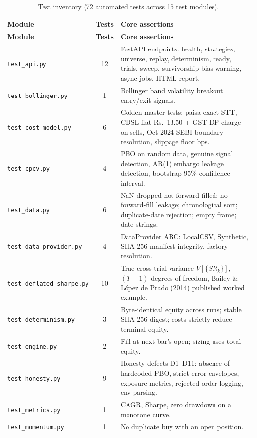 \documentclass[12pt,a4paper,oneside]{report}
\newcommand{\rupee}{Rs.\ }
\begin{document}
\begin{center}
\small
\begin{longtable}{@{}p{4.5cm}cp{7.0cm}@{}}
\caption[Automated Test Inventory]{Test inventory (72 automated tests across 16 test modules).} \label{tab:tests} \\
\toprule
\textbf{Module} & \textbf{Tests} & \textbf{Core assertions} \\
\midrule
\endfirsthead
\toprule
\textbf{Module} & \textbf{Tests} & \textbf{Core assertions} \\
\midrule
\endhead
\texttt{test\_api.py} & 12 & FastAPI endpoints: health, strategies, universe, replay, determinism, ready, trials, sweep, survivorship bias warning, async jobs, HTML report. \\
\texttt{test\_bollinger.py} & 1 & Bollinger band volatility breakout entry/exit signals. \\
\texttt{test\_cost\_model.py} & 6 & Golden-master tests: paisa-exact STT, CDSL flat \rupee 13.50 + GST DP charge on sells, Oct 2024 SEBI boundary resolution, slippage floor bps. \\
\texttt{test\_cpcv.py} & 4 & PBO on random data, genuine signal detection, AR(1) embargo leakage detection, bootstrap 95\% confidence interval. \\
\texttt{test\_data.py} & 6 & NaN dropped not forward-filled; no forward-fill leakage; chronological sort; duplicate-date rejection; empty frame; date strings. \\
\texttt{test\_data\_provider.py} & 4 & DataProvider ABC: LocalCSV, Synthetic, SHA-256 manifest integrity, factory resolution. \\
\texttt{test\_deflated\_sharpe.py} & 10 & True cross-trial variance $V[\{SR_k\}]$, $(T-1)$ degrees of freedom, Bailey \& López de Prado (2014) published worked example.\hfill \\
\texttt{test\_determinism.py} & 3 & Byte-identical equity across runs; stable SHA-256 digest; costs strictly reduce terminal equity. \\
\texttt{test\_engine.py} & 2 & Fill at next bar's open; sizing uses total equity. \\
\texttt{test\_honesty.py} & 9 & Honesty defects D1–D11: absence of hardcoded PBO, strict error envelopes, exposure metrics, rejected order logging, env parsing. \\
\texttt{test\_metrics.py} & 1 & CAGR, Sharpe, zero drawdown on a monotone curve. \\
\texttt{test\_momentum.py} & 1 & No duplicate buy with an open position. \\

\end{longtable}
\end{center}
\end{document}
